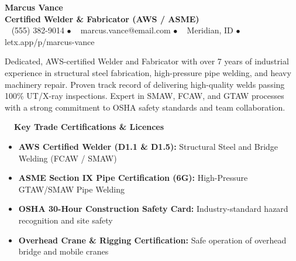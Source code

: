 \documentclass[10pt]{article}
\begin{document}
\pagestyle{empty}
\color{charcoal}

\begin{center}
  {\Huge \bfseries \color{primary} Marcus Vance} \\
  \vspace{3pt}
  {\large \bfseries \color{darktext} Certified Welder \& Fabricator (AWS / ASME)} \\
  \vspace{4pt}
  \small
  \faPhone~ (555) 382-9014 \quad $\bullet$ \quad
  \faEnvelope~ marcus.vance@email.com \quad $\bullet$ \quad
  \faMapMarker~ Meridian, ID \quad $\bullet$ \quad
  \faFile~ letx.app/p/marcus-vance
\end{center}

\vspace{-2pt}

\noindent
Dedicated, AWS-certified Welder and Fabricator with over 7 years of industrial experience in structural steel fabrication, high-pressure pipe welding, and heavy machinery repair. Proven track record of delivering high-quality welds passing 100\% UT/X-ray inspections. Expert in SMAW, FCAW, and GTAW processes with a strong commitment to OSHA safety standards and team collaboration.

\vspace{6pt}

\begin{certbox}
  \noindent
  \textbf{\color{primary}\faAward~~Key Trade Certifications \& Licences}
  \vspace{3pt}
  \begin{itemize}
    \item \textbf{AWS Certified Welder (D1.1 \& D1.5):} Structural Steel and Bridge Welding (FCAW / SMAW)
    \item \textbf{ASME Section IX Pipe Certification (6G):} High-Pressure GTAW/SMAW Pipe Welding
    \item \textbf{OSHA 30-Hour Construction Safety Card:} Industry-standard hazard recognition and site safety
    \item \textbf{Overhead Crane \& Rigging Certification:} Safe operation of overhead bridge and mobile cranes
  \end{itemize}
\end{certbox}

\end{document}
